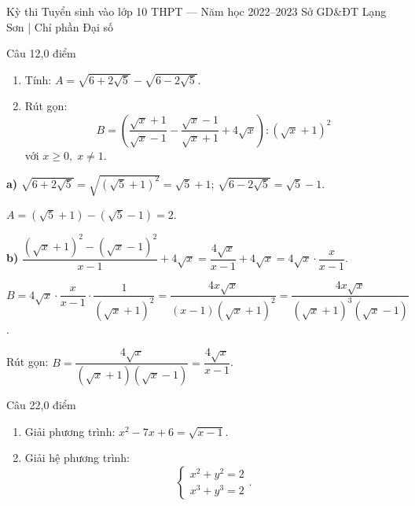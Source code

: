 ﻿%
%
  {Kỳ thi Tuyển sinh vào lớp 10 THPT — Năm học 2022--2023}%
  {Sở GD\&ĐT Lạng Sơn | Chỉ phần Đại số}

\begin{de_cau}{Câu 1}{2,0 điểm}
\begin{enumerate}[label=\alph*)]
  \item Tính: $A = \sqrt{6+2\sqrt{5}} - \sqrt{6-2\sqrt{5}}$.
  \item Rút gọn:
  \[B = \left(\dfrac{\sqrt{x}+1}{\sqrt{x}-1}-\dfrac{\sqrt{x}-1}{\sqrt{x}+1}+4\sqrt{x}\right) : (\sqrt{x}+1)^2\]
  với $x \ge 0,\; x \neq 1$.
\end{enumerate}
\end{de_cau}

\begin{loi_giai_cau}
\textbf{a)} $\sqrt{6+2\sqrt{5}}=\sqrt{(\sqrt{5}+1)^2}=\sqrt{5}+1$; $\sqrt{6-2\sqrt{5}}=\sqrt{5}-1$.

$A=(\sqrt{5}+1)-(\sqrt{5}-1)=\boxed{2}$.

\textbf{b)} $\dfrac{(\sqrt{x}+1)^2-(\sqrt{x}-1)^2}{x-1}+4\sqrt{x}=\dfrac{4\sqrt{x}}{x-1}+4\sqrt{x}=4\sqrt{x}\cdot\dfrac{x}{x-1}$.

$B=4\sqrt{x}\cdot\dfrac{x}{x-1}\cdot\dfrac{1}{(\sqrt{x}+1)^2}=\dfrac{4x\sqrt{x}}{(x-1)(\sqrt{x}+1)^2}=\dfrac{4x\sqrt{x}}{(\sqrt{x}+1)^3(\sqrt{x}-1)}$.

Rút gọn: $B=\boxed{\dfrac{4\sqrt{x}}{(\sqrt{x}+1)(\sqrt{x}-1)}}=\dfrac{4\sqrt{x}}{x-1}$.
\end{loi_giai_cau}

\begin{de_cau}{Câu 2}{2,0 điểm}
\begin{enumerate}[label=\alph*)]
  \item Giải phương trình: $x^2 - 7x + 6 = \sqrt{x-1}$.
  \item Giải hệ phương trình:
  \[\begin{cases} x^2+y^2=2 \\ x^3+y^3=2 \end{cases}.\]
\end{enumerate}
\end{de_cau}

